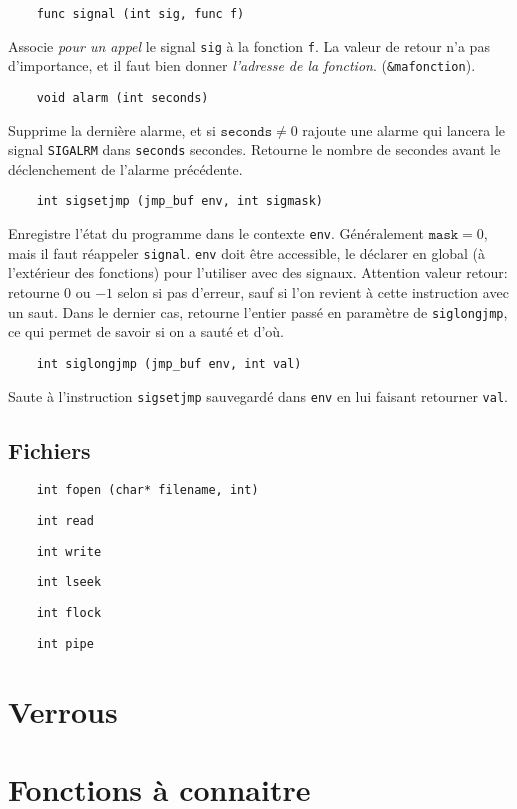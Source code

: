 \documentclass[10pt,twocolumn,a4paper]{article}
\begin{document}
\begin{lstlisting}
    func signal (int sig, func f)
\end{lstlisting}
Associe \emph{pour un appel} le signal \texttt{sig} à la fonction \texttt{f}.
La valeur de retour n'a pas d'importance, et il faut bien donner \emph{l'adresse de la fonction}.
(\texttt{\&mafonction}).

\begin{lstlisting}
    void alarm (int seconds)
\end{lstlisting}
Supprime la dernière alarme, et si $\texttt{seconds} \neq 0$ rajoute une alarme qui lancera le signal \texttt{SIGALRM} dans \texttt{seconds} secondes.
Retourne le nombre de secondes avant le déclenchement de l'alarme précédente.

\begin{lstlisting}
    int sigsetjmp (jmp_buf env, int sigmask)
\end{lstlisting}
Enregistre l'état du programme dans le contexte \texttt{env}. Généralement $\texttt{mask} = 0$, mais il faut réappeler \texttt{signal}.
\texttt{env} doit être accessible, le déclarer en global (à l'extérieur des fonctions) pour l'utiliser avec des signaux.
Attention valeur retour: retourne $0$ ou $-1$ selon si pas d'erreur, sauf si l'on revient à cette instruction avec un saut.
Dans le dernier cas, retourne l'entier passé en paramètre de \texttt{siglongjmp}, ce qui permet de savoir si on a sauté et d'où.

\begin{lstlisting}
    int siglongjmp (jmp_buf env, int val)
\end{lstlisting}
Saute à l'instruction \texttt{sigsetjmp} sauvegardé dans \texttt{env} en lui faisant retourner \texttt{val}.

\subsection{Fichiers}

\begin{lstlisting}
    int fopen (char* filename, int)
\end{lstlisting}

\begin{lstlisting}
    int read
\end{lstlisting}

\begin{lstlisting}
    int write
\end{lstlisting}

\begin{lstlisting}
    int lseek
\end{lstlisting}

\begin{lstlisting}
    int flock
\end{lstlisting}

\begin{lstlisting}
    int pipe
\end{lstlisting}








\section{Verrous}

\section{Fonctions à connaitre}
\end{document}
